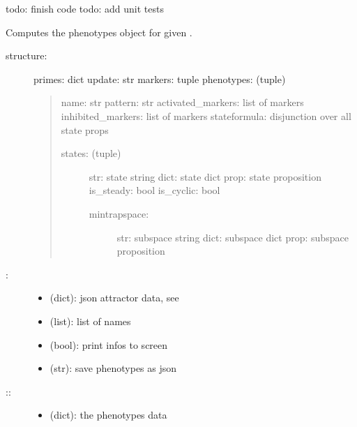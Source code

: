 \documentclass[letterpaper,10pt,english]{sphinxmanual}
\begin{document}
\begin{fulllineitems}
\label{\detokenize{Phenotypes:PyBoolNet.Phenotypes.compute_json}}
todo: finish code
todo: add unit tests

Computes the phenotypes object for given .
\begin{description}
\item[{structure:}] \leavevmode
primes: dict
update: str
markers: tuple
phenotypes: (tuple)
\begin{quote}

name: str
pattern: str
activated\_markers: list of markers
inhibited\_markers: list of markers
stateformula: disjunction over all state props
\begin{description}
\item[{states: (tuple)}] \leavevmode
str: state string
dict: state dict
prop: state proposition
is\_steady: bool
is\_cyclic: bool
\begin{description}
\item[{mintrapspace:}] \leavevmode
str: subspace string
dict: subspace dict
prop: subspace proposition

\end{description}

\end{description}
\end{quote}

\item[{:}] \leavevmode\begin{itemize}
\item {} 
 (dict): json attractor data, see {\hyperref[\detokenize{Attractors:attractors-compute-json}]{}}

\item {} 
 (list): list of names

\item {} 
 (bool): print infos to screen

\item {} 
 (str): save phenotypes as json

\end{itemize}

\item[{::}] \leavevmode\begin{itemize}
\item {} 
 (dict): the phenotypes data


\end{itemize}
\end{description}
\end{fulllineitems}
\end{document}
